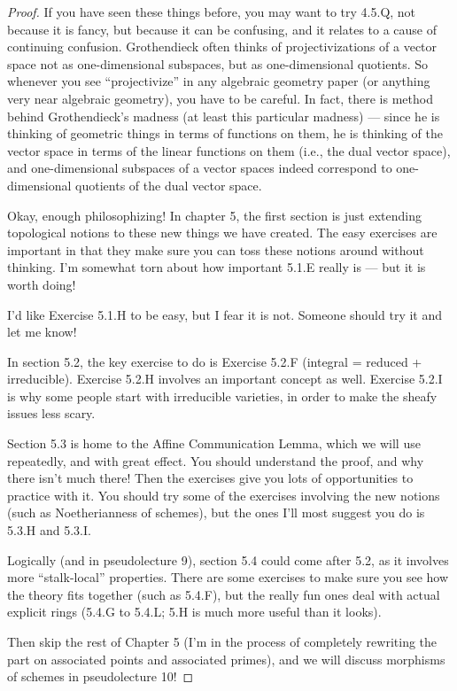\documentclass{book}
\theoremstyle{definition}
\begin{document}
\begin{proof}
If you have seen these things before, you may want to try 4.5.Q, not because it is fancy, but because it can be confusing, and it relates to a cause of continuing confusion. Grothendieck often thinks of projectivizations of a vector space not as one-dimensional subspaces, but as one-dimensional quotients. So whenever you see “projectivize” in any algebraic geometry paper (or anything very near algebraic geometry), you have to be careful. In fact, there is method behind Grothendieck’s madness (at least this particular madness) — since he is thinking of geometric things in terms of functions on them, he is thinking of the vector space in terms of the linear functions on them (i.e., the dual vector space), and one-dimensional subspaces of a vector spaces indeed correspond to one-dimensional quotients of the dual vector space.

Okay, enough philosophizing! In chapter 5, the first section is just extending topological notions to these new things we have created. The easy exercises are important in that they make sure you can toss these notions around without thinking. I’m somewhat torn about how important 5.1.E really is — but it is worth doing!

I’d like Exercise 5.1.H to be easy, but I fear it is not. Someone should try it and let me know!

In section 5.2, the key exercise to do is Exercise 5.2.F (integral = reduced + irreducible). Exercise 5.2.H involves an important concept as well. Exercise 5.2.I is why some people start with irreducible varieties, in order to make the sheafy issues less scary.

Section 5.3 is home to the Affine Communication Lemma, which we will use repeatedly, and with great effect. You should understand the proof, and why there isn’t much there! Then the exercises give you lots of opportunities to practice with it. You should try some of the exercises involving the new notions (such as Noetherianness of schemes), but the ones I’ll most suggest you do is 5.3.H and 5.3.I.

Logically (and in pseudolecture 9), section 5.4 could come after 5.2, as it involves more “stalk-local” properties. There are some exercises to make sure you see how the theory fits together (such as 5.4.F), but the really fun ones deal with actual explicit rings (5.4.G to 5.4.L; 5.H is much more useful than it looks).

Then skip the rest of Chapter 5 (I’m in the process of completely rewriting the part on associated points and associated primes), and we will discuss morphisms of schemes in pseudolecture 10!


\end{proof}
\end{document}
